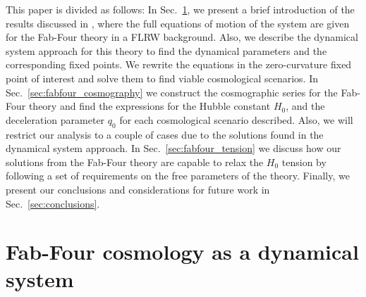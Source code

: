 \documentclass[onecolumn,superscriptaddress,secnumarabic,amssymb,amsmath,nobibnotes,aps,prd,nofootinbib,altaffilletter]{revtex4}
\begin{document}
This paper is divided as follows: 
In Sec.~\ref{sec:fabfour-intro}, we present a brief introduction of the results discussed in \cite{Copeland:2012qf}, where the full equations of motion of the system are given for the Fab-Four theory in a FLRW background. Also, we describe the dynamical system approach for this theory to find the dynamical parameters and the corresponding fixed points. We rewrite the equations in the zero-curvature fixed point of interest and solve them to find viable cosmological scenarios. 
In Sec.~\ref{sec:fabfour_cosmography} we construct the cosmographic series for the Fab-Four theory and find the expressions for the Hubble constant $H_0$, and the deceleration parameter $q_0$ for each cosmological scenario described. Also, we will restrict our analysis to a couple of cases due to the solutions found in the dynamical system approach. 
In Sec.~\ref{sec:fabfour_tension} we discuss how our solutions from the Fab-Four theory are capable to relax the $H_0$ tension by following a set of requirements on the free parameters of the theory. Finally, we present our conclusions and considerations for future work in Sec.~\ref{sec:conclusions}.


\section{Fab-Four cosmology as a dynamical system}
\label{sec:fabfour-intro}
\end{document}
